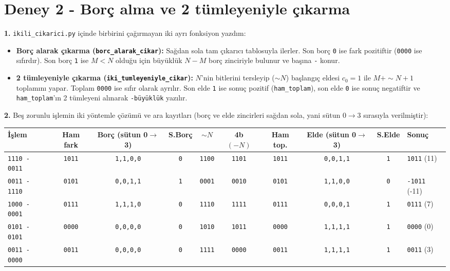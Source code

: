 \documentclass[10pt,a4paper]{article}
\begin{document}
\newpage

\section*{Deney 2 - Borç alma ve 2 tümleyeniyle çıkarma}

\textbf{1.} \texttt{ikili\_cikarici.py} içinde birbirini çağırmayan iki ayrı fonksiyon yazdım:
\begin{itemize}
    \item \textbf{Borç alarak çıkarma (\texttt{borc\_alarak\_cikar}):} Sağdan sola tam çıkarıcı tablosuyla ilerler. Son borç \texttt{0} ise fark pozitiftir (\texttt{0000} ise sıfırdır). Son borç \texttt{1} ise $M < N$ olduğu için büyüklük $N - M$ borç zinciriyle bulunur ve başına \texttt{-} konur.
    \item \textbf{2 tümleyeniyle çıkarma (\texttt{iki\_tumleyeniyle\_cikar}):} $N$'nin bitlerini tersleyip ($\sim N$) başlangıç eldesi $c_0 = 1$ ile $M + \sim N + 1$ toplamını yapar. Toplam \texttt{0000} ise sıfır olarak ayrılır. Son elde \texttt{1} ise sonuç pozitif (\texttt{ham\_toplam}), son elde \texttt{0} ise sonuç negatiftir ve \texttt{ham\_toplam}'ın 2 tümleyeni alınarak \texttt{-büyüklük} yazılır.
\end{itemize}

\textbf{2.} Beş zorunlu işlemin iki yöntemle çözümü ve ara kayıtları (borç ve elde zincirleri sağdan sola, yani sütun $0\rightarrow 3$ sırasıyla verilmiştir):

\begin{center}
\small
\begin{tabular}{lccccccccl}
\toprule
İşlem & Ham fark & Borç (sütun 0$\rightarrow$3) & S.Borç & $\sim N$ & 4b $(-N)$ & Ham top. & Elde (sütun 0$\rightarrow$3) & S.Elde & Sonuç \\
\midrule
\texttt{1110 - 0011} & \texttt{1011} & \texttt{1,1,0,0} & \texttt{0} & \texttt{1100} & \texttt{1101} & \texttt{1011} & \texttt{0,0,1,1} & \texttt{1} & \texttt{1011} (11) \\
\texttt{0011 - 1110} & \texttt{0101} & \texttt{0,0,1,1} & \texttt{1} & \texttt{0001} & \texttt{0010} & \texttt{0101} & \texttt{1,1,0,0} & \texttt{0} & \texttt{-1011} (-11) \\
\texttt{1000 - 0001} & \texttt{0111} & \texttt{1,1,1,0} & \texttt{0} & \texttt{1110} & \texttt{1111} & \texttt{0111} & \texttt{0,0,0,1} & \texttt{1} & \texttt{0111} (7) \\
\texttt{0101 - 0101} & \texttt{0000} & \texttt{0,0,0,0} & \texttt{0} & \texttt{1010} & \texttt{1011} & \texttt{0000} & \texttt{1,1,1,1} & \texttt{1} & \texttt{0000} (0) \\
\texttt{0011 - 0000} & \texttt{0011} & \texttt{0,0,0,0} & \texttt{0} & \texttt{1111} & \texttt{0000} & \texttt{0011} & \texttt{1,1,1,1} & \texttt{1} & \texttt{0011} (3) \\
\bottomrule
\end{tabular}
\end{center}
\end{document}
